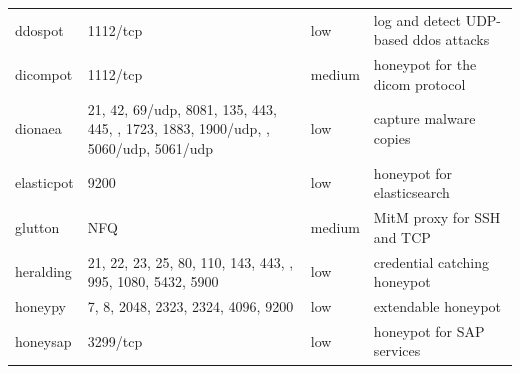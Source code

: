 \begin{table}
\begin{tabularx}{\linewidth}{l|XlX}
        ddospot \cite{ddosspot2021}              & 1112/tcp                                                                                                    & low                        & log and detect UDP-based \ac{ddos} attacks                                           \\
        dicompot \cite{dicompot2021}             & 1112/tcp                                                                                                    & medium                     & honeypot for the \ac{dicom} protocol                                                 \\
        dionaea \cite{dionaea2021}               & 21, 42, 69/udp, 8081, 135, 443, 445, \newline 1433, 1723, 1883, 1900/udp, \newline 3306, 5060/udp, 5061/udp & low                        & capture malware copies                                                               \\
        elasticpot \cite{elasticpot2021}         & 9200                                                                                                        & low                        & honeypot for elasticsearch                                                           \\
        glutton \cite{glutton2021}               & NFQ                                                                                                         & medium                     & MitM proxy for SSH and TCP                                                           \\
        heralding \cite{heralding2021}           & 21, 22, 23, 25, 80, 110, 143, 443, \newline 993, 995, 1080, 5432, 5900                                      & low                        & credential catching honeypot                                                         \\
        honeypy \cite{honeysap2021}              & 7, 8, 2048, 2323, 2324, 4096, 9200                                                                          & low                        & extendable honeypot                                                                  \\
        honeysap \cite{honeysap2021}             & 3299/tcp                                                                                                    & low                        & honeypot for SAP services                                                            \\

\end{tabularx}
\end{table}
